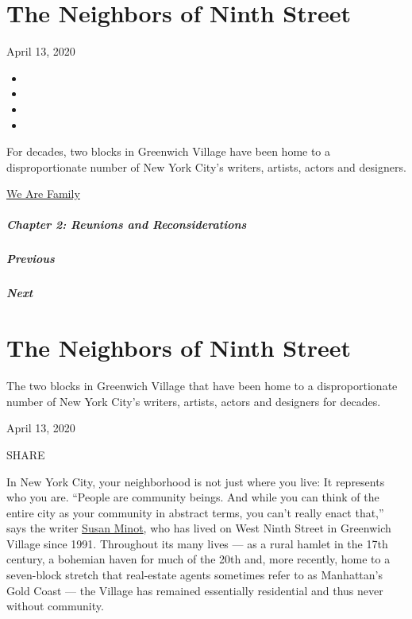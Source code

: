\hypertarget{the-neighbors-of-ninth-street}{%
\section{The Neighbors of Ninth
Street}\label{the-neighbors-of-ninth-street}}

April 13, 2020

\begin{itemize}
\item
\item
\item
\item
\end{itemize}

For decades, two blocks in Greenwich Village have been home to a
disproportionate number of New York City's writers, artists, actors and
designers.

\href{https://www.nytimes.com/interactive/2020/04/13/t-magazine/culture-issue-2020.html}{We
Are Family}

\hypertarget{chapter-2-reunions-and-reconsiderations}{%
\subparagraph{Chapter 2: Reunions and
Reconsiderations}\label{chapter-2-reunions-and-reconsiderations}}

\hypertarget{previous}{%
\subparagraph{Previous}\label{previous}}

\hypertarget{next}{%
\subparagraph{Next}\label{next}}

\hypertarget{the-neighbors-of-ninth-street-1}{%
\section{The Neighbors of Ninth
Street}\label{the-neighbors-of-ninth-street-1}}

The two blocks in Greenwich Village that have been home to a
disproportionate number of New York City's writers, artists, actors and
designers for decades.

April 13, 2020

SHARE

In New York City, your neighborhood is not just where you live: It
represents who you are. ``People are community beings. And while you can
think of the entire city as your community in abstract terms, you can't
really enact that,'' says the writer
\href{https://www.penguinrandomhouse.com/authors/20823/susan-minot}{Susan
Minot}, who has lived on West Ninth Street in Greenwich Village since
1991. Throughout its many lives --- as a rural hamlet in the 17th
century, a bohemian haven for much of the 20th and, more recently, home
to a seven-block stretch that real-estate agents sometimes refer to as
Manhattan's Gold Coast --- the Village has remained essentially
residential and thus never without community.


